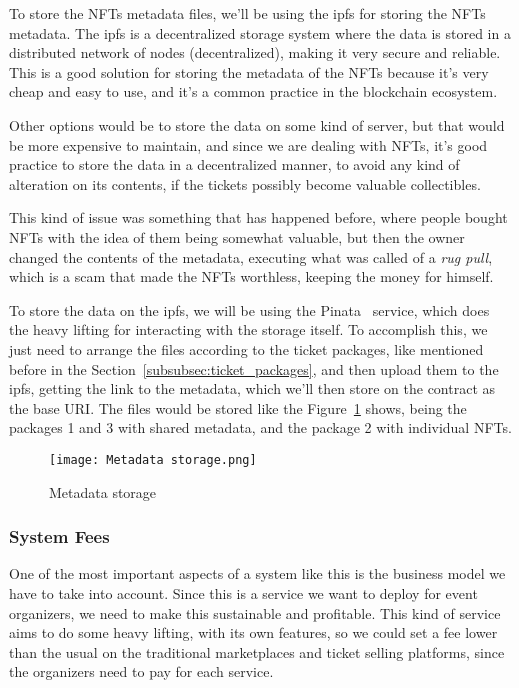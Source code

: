 To store the NFTs metadata files, we'll be using the \gls{ipfs} for storing the
NFTs metadata. The \gls{ipfs} is a decentralized storage system where the data
is stored in a distributed network of nodes (decentralized), making it very
secure and reliable. This is a good solution for storing the metadata of the
NFTs because it's very cheap and easy to use, and it's a common practice in the
blockchain ecosystem.

Other options would be to store the data on some kind of server, but that would
be more expensive to maintain, and since we are dealing with NFTs, it's good
practice to store the data in a decentralized manner, to avoid any kind of
alteration on its contents, if the tickets possibly become valuable
collectibles.

This kind of issue was something that has happened before, where people bought
NFTs with the idea of them being somewhat valuable, but then the owner changed
the contents of the metadata, executing what was called of a \textit{rug pull},
which is a scam that made the NFTs worthless, keeping the money for himself.

To store the data on the \gls{ipfs}, we will be using the Pinata~\cite{pinata}
service, which does the heavy lifting for interacting with the storage itself.
To accomplish this, we just need to arrange the files according to the ticket
packages, like mentioned before in the Section~\ref{subsubsec:ticket_packages},
and then upload them to the \gls{ipfs}, getting the link to the metadata, which
we'll then store on the contract as the base URI. The files would be stored
like the Figure~\ref{fig:metadata_storage} shows, being the packages 1 and 3
with shared metadata, and the package 2 with individual NFTs.

\begin{figure}[H]
	\texttt{[image: Metadata storage.png]}
	\centering
	\caption{Metadata storage}\label{fig:metadata_storage}
\end{figure}

\subsubsection{System Fees}\label{subsubsec:system_fees}

One of the most important aspects of a system like this is the business model
we have to take into account. Since this is a service we want to deploy for
event organizers, we need to make this sustainable and profitable. This kind of
service aims to do some heavy lifting, with its own features, so we could set a
fee lower than the usual on the traditional marketplaces and ticket selling
platforms, since the organizers need to pay for each service.

